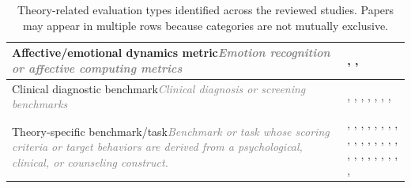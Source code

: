 \begin{table}[tbp]
\begin{tabular}{p{6cm}p{8cm}}
\midrule
Affective/emotional dynamics metric\newline\textcolor{gray}{\footnotesize{\textit{Emotion recognition or affective computing metrics}}} & \citealp{Haydarov2025Towards}, \citealp{Schmidmaier2025UsingNonverbal}, \citealp{Wang2025Feel} \\
\midrule
Clinical diagnostic benchmark\newline\textcolor{gray}{\footnotesize{\textit{Clinical diagnosis or screening benchmarks}}} & \citealp{Qiu2025EmoAgent}, \citealp{Hu2024PsycoLLM}, \citealp{Fouda2026PsychiatryBench}, \citealp{Cai2026Exploring}, \citealp{Ozgun2025Trustworthy}, \citealp{Liu2025Eeyore}, \citealp{Chen2023LLM-empowered}, \citealp{Schmidgall2025AgentClinic} \\
\midrule
Theory-specific benchmark/task\newline\textcolor{gray}{\footnotesize{\textit{Benchmark or task whose scoring criteria or target behaviors are derived from a psychological, clinical, or counseling construct.}}} & \citealp{Qiu2025EmoAgent}, \citealp{Aghakhani2025From}, \citealp{Wang2025CARE-Bench}, \citealp{Sungarda2025GenAI}, \citealp{Chiu2024A}, \citealp{Hu2024PsycoLLM}, \citealp{Fouda2026PsychiatryBench}, \citealp{Nguyen2025Do}, \citealp{Zhang2025CBT-BENCH}, \citealp{Kim2025KMI}, \citealp{Jaiswal2024Building}, \citealp{Xu2025MentalChat16K}, \citealp{Ozgun2025Trustworthy}, \citealp{Wang2024PATIENT}, \citealp{Lee2024CACTUS}, \citealp{Kermani2025Systematic}, \citealp{Feng2025Reframe}, \citealp{Kim2025Can}, \citealp{Liu2025Eeyore}, \citealp{Wang2025Feel}, \citealp{Samuel2025PersonaGym}, \citealp{Na2024CBT-LLM}, \citealp{Sharma2023Cognitive}, \citealp{Kang2024Can}, \citealp{Chen2023LLM-empowered}, \citealp{Tanana2019Development} \\
\bottomrule
\end{tabular}
\caption{Theory-related evaluation types identified across the reviewed studies. Papers may appear in multiple rows because categories are not mutually exclusive.}
\label{tab:eval-types}
\end{table}










